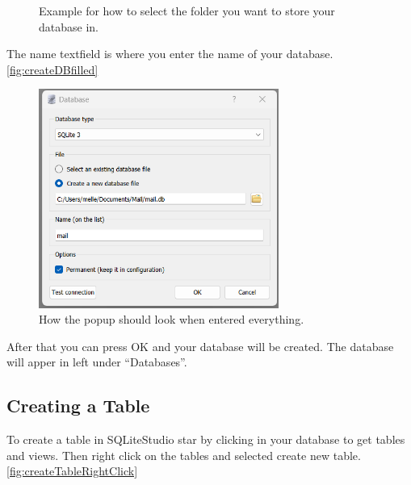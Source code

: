 \documentclass[a4paper,11pt,oneside]{article}
\begin{document}
\begin{sloppypar}
\begin{figure}[!htb]
  \caption{Example for how to select the folder you want to store your database in.}
  \label{fig:createDBnavigate}
\end{figure}
The name textfield is where you enter the name of your database. \autoref{fig:createDBfilled}
\begin{figure}[!htb]
  \centering
  \includegraphics[width=0.7\textwidth]{sqlitestudio/create_database/create_database_populated.png}
  \caption{How the popup should look when entered everything.}
  \label{fig:createDBfilled}
\end{figure}
After that you can press OK and your database will be created. The database will apper in left under ``Databases''.

\subsection{Creating a Table}
\label{sqliteStudioCreatingTable}
To create a table in SQLiteStudio star by clicking in your database to get tables and views. Then right click on the tables and selected create new table.\autoref{fig:createTableRightClick}


\end{sloppypar}
\end{document}
